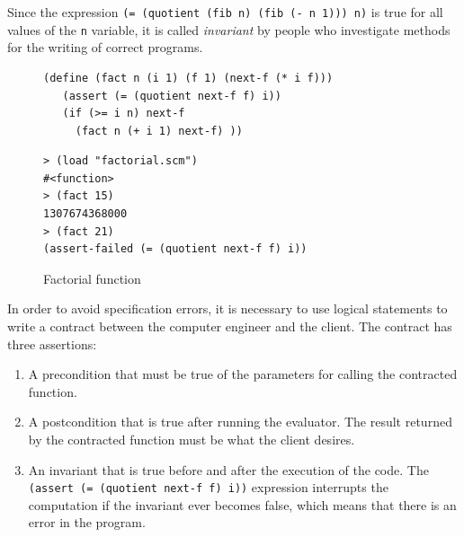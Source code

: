 \documentclass[a4paper,12pt]{book}
\newenvironment{fmpage}[1]
               {\begin{lrbox}{\fmbox}\begin{minipage}{#1}}
               {\end{minipage}\end{lrbox}\fbox{\usebox{\fmbox}}}
\begin{document}
Since the
expression \verb|(= (quotient (fib n) (fib (- n 1))) n)|
is true for all values of the \verb|n| variable,
it is called {\em invariant} by people
who investigate methods for the writing of correct
programs.

\begin{figure}[!h]
\begin{fmpage}{0.8\linewidth}
\begin{verbatim}
(define (fact n (i 1) (f 1) (next-f (* i f)))
   (assert (= (quotient next-f f) i))
   (if (>= i n) next-f
     (fact n (+ i 1) next-f) ))
\end{verbatim}
\end{fmpage}

\begin{fmpage}{0.8\linewidth}
\begin{verbatim}
> (load "factorial.scm")
#<function>
> (fact 15)
1307674368000
> (fact 21)
(assert-failed (= (quotient next-f f) i))
\end{verbatim}
\end{fmpage}
\caption{Factorial function}
\label{loop-invariant/fact}
\end{figure}

In order to avoid specification errors,
it is necessary to use logical statements
to write a contract between the computer
engineer and the client. The contract has
three assertions:
\begin{enumerate}
\item A precondition that must be true
of the parameters for calling the contracted function.
\item A postcondition that is true after running
  the evaluator. The result returned by the
  contracted function must be what the client desires.
\item An invariant that is
  true before and after the execution of the code.  
The \verb|(assert (= (quotient next-f f) i))|
expression interrupts the computation if
the invariant ever becomes false, which
means that there is an error in the program.
\end{enumerate}
\end{document}

